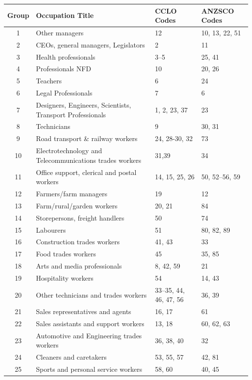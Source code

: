 \begin{table}
\centering
\begin{tabular}{clll}
  \hline
{\bf Group} & {\bf Occupation Title} & {\bf CCLO Codes} & {\bf ANZSCO Codes} \\ 
  \hline
   1 & Other managers & 12 & 10, 13, 22, 51 \\ 
   2 & CEOs, general managers, Legislators & 2 & 11 \\ 
   3 & Health professionals & 3--5 & 25, 41 \\ 
   4 & Professionals NFD & 10 & 20, 26 \\ 
   5 & Teachers & 6 & 24 \\ 
   6 & Legal Professionals & 7 & 6 \\ 
   7 & Designers, Engineers, Scientists, Transport Professionals & 1, 2, 23, 37 & 23 \\ 
   8 & Technicians & 9 & 30, 31 \\ 
   9 & Road transport \& railway workers & 24, 28-30, 32 & 73 \\ 
  10 & Electrotechnology and Telecommunications trades workers & 31,39 & 34 \\ 
  11 & Office support, clerical and postal workers & 14, 15, 25, 26 & 50, 52--56, 59  \\ 
  12 & Farmers/farm managers & 19 & 12 \\ 
  13 & Farm/rural/garden workers & 20, 21 & 84 \\ 
  14 & Storepersons, freight handlers & 50 & 74 \\ 
  15 & Labourers & 51 & 80, 82, 89 \\ 
  16 & Construction trades workers & 41, 43 & 33 \\ 
  17 & Food trades workers & 45 & 35, 85 \\ 
  18 & Arts and media professionals & 8, 42, 59 & 21 \\ 
  19 & Hospitality workers & 54 & 14, 43 \\ 
  20 & Other technicians and trades workers & 33--35, 44, 46, 47, 56 & 36, 39 \\ 
  21 & Sales representatives and agents & 16, 17 & 61 \\ 
  22 & Sales assistants and support workers & 13, 18 & 60, 62, 63 \\ 
  23 & Automotive and Engineering trades workers & 36, 38, 40 & 32 \\ 
  24 & Cleaners and caretakers & 53, 55, 57 & 42, 81 \\ 
  25 & Sports and personal service workers & 58, 60 & 40, 45 \\ 

\end{tabular}
\end{table}
